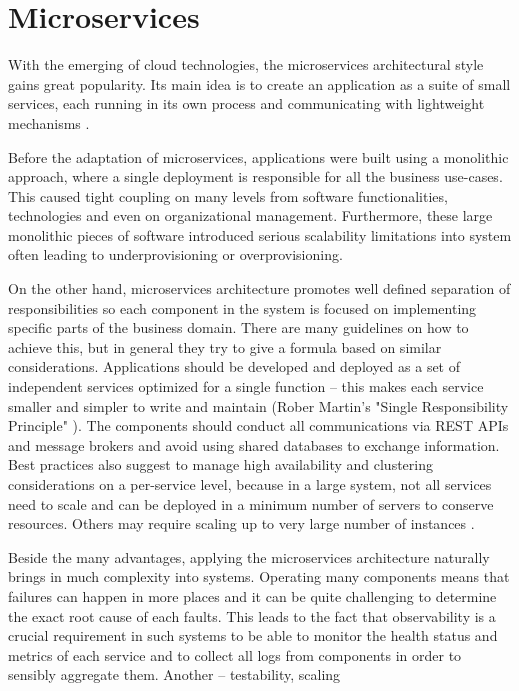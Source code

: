 \section{Microservices}

With the emerging of cloud technologies, the microservices architectural style gains great popularity. Its main idea is to create an application as a suite of small services, each running in its own process and communicating with lightweight mechanisms \cite{MicroservicesMF}.

Before the adaptation of microservices, applications were built using a monolithic approach, where a single deployment is responsible for all the business use-cases. This caused tight coupling on many levels from software functionalities, technologies and even on organizational management. Furthermore, these large monolithic pieces of software introduced serious scalability limitations into system often leading to underprovisioning or overprovisioning.

On the other hand, microservices architecture promotes well defined separation of responsibilities so each component in the system is focused on implementing specific parts of the business domain. There are many guidelines on how to achieve this, but in general they try to give a formula based on similar considerations. Applications should be developed and deployed as a set of independent services optimized for a single function -- this makes each service smaller and simpler to write and maintain (Rober Martin's "Single Responsibility Principle" \cite{RobertMartinOOP}). The components should conduct all communications via REST APIs and message brokers and avoid using shared databases to exchange information. Best practices also suggest to manage high availability and clustering considerations on a per-service level, because in a large system, not all services need to scale and can be deployed in a minimum number of servers to conserve resources. Others may require scaling up to very large number of instances \cite{ImplPatternsMicrosServices}.

Beside the many advantages, applying the microservices architecture naturally brings in much complexity into systems. Operating many components means that failures can happen in more places and it can be quite challenging to determine the exact root cause of each faults. This leads to the fact that observability is a crucial requirement in such systems to be able to monitor the health status and metrics of each service and to collect all logs from components in order to sensibly aggregate them. Another -- testability, scaling


